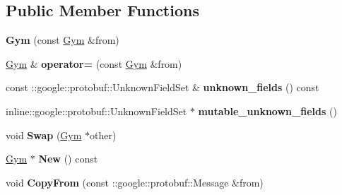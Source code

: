 \subsection*{Public Member Functions}
\begin{DoxyCompactItemize}
\item 
\hypertarget{classexercise__protobuf_1_1_gym_aedf540820ea28179f800019a5d2878e7}{}{\bfseries Gym} (const \hyperlink{classexercise__protobuf_1_1_gym}{Gym} \&from)\label{classexercise__protobuf_1_1_gym_aedf540820ea28179f800019a5d2878e7}

\item 
\hypertarget{classexercise__protobuf_1_1_gym_aa445fc51b8f08f6f955c584986cb786c}{}\hyperlink{classexercise__protobuf_1_1_gym}{Gym} \& {\bfseries operator=} (const \hyperlink{classexercise__protobuf_1_1_gym}{Gym} \&from)\label{classexercise__protobuf_1_1_gym_aa445fc51b8f08f6f955c584986cb786c}

\item 
\hypertarget{classexercise__protobuf_1_1_gym_a95b77c95cb7b94d13b5dd0bc06975476}{}const \+::google\+::protobuf\+::\+Unknown\+Field\+Set \& {\bfseries unknown\+\_\+fields} () const \label{classexercise__protobuf_1_1_gym_a95b77c95cb7b94d13b5dd0bc06975476}

\item 
\hypertarget{classexercise__protobuf_1_1_gym_a5c9ac1981c2183dff6c888c3364d8bee}{}inline\+::google\+::protobuf\+::\+Unknown\+Field\+Set $\ast$ {\bfseries mutable\+\_\+unknown\+\_\+fields} ()\label{classexercise__protobuf_1_1_gym_a5c9ac1981c2183dff6c888c3364d8bee}

\item 
\hypertarget{classexercise__protobuf_1_1_gym_abf56c14bbf7c0bac857af6743f19ab97}{}void {\bfseries Swap} (\hyperlink{classexercise__protobuf_1_1_gym}{Gym} $\ast$other)\label{classexercise__protobuf_1_1_gym_abf56c14bbf7c0bac857af6743f19ab97}

\item 
\hypertarget{classexercise__protobuf_1_1_gym_a376d416d53df49a87de25d62a40526ea}{}\hyperlink{classexercise__protobuf_1_1_gym}{Gym} $\ast$ {\bfseries New} () const \label{classexercise__protobuf_1_1_gym_a376d416d53df49a87de25d62a40526ea}

\item 
\hypertarget{classexercise__protobuf_1_1_gym_a7094f8391d1ed49797dac887057f4825}{}void {\bfseries Copy\+From} (const \+::google\+::protobuf\+::\+Message \&from)\label{classexercise__protobuf_1_1_gym_a7094f8391d1ed49797dac887057f4825}


\end{DoxyCompactItemize}
